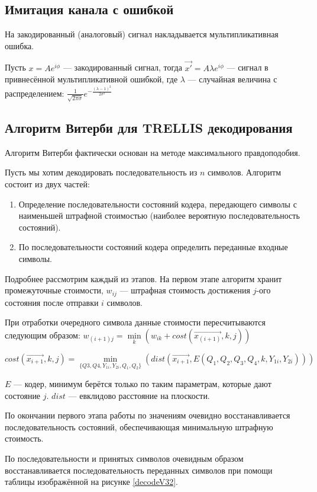 \documentclass[a4paper,12pt]{article}
\begin{document}
\subsection{Имитация канала с ошибкой}
На закодированный (аналоговый) сигнал накладывается мультипликативная ошибка. 

Пусть $x = A e^{i\phi}$ --- закодированный сигнал, тогда $\vec{x'} = A\lambda e^{i\phi}$ --- сигнал в привнесённой
мультипликативной ошибкой, где $\lambda$ --- случайная величина с распределением: 
$\frac{1}{\sqrt{2\pi\sigma}}e^{-\frac{(\lambda - 1)^2}{2\sigma^2}}$

\subsection{Алгоритм Витерби для TRELLIS декодирования}
Алгоритм Витерби фактически основан на методе максимального правдоподобия.

Пусть мы хотим декодировать последовательность из $n$ символов. Алгоритм состоит из двух частей:
\begin{enumerate}
	\item Определение последовательности состояний кодера, передающего символы с наименьшей штрафной стоимостью
		(наиболее вероятную последовательность состояний).
	\item По последовательности состояний кодера определить переданные входные символы.
\end{enumerate}

Подробнее рассмотрим каждый из этапов. На первом этапе алгоритм хранит промежуточные стоимости, $w_{ij}$ --- штрафная
стоимость достижения $j$-ого состояния после отправки $i$ символов.

При отработки очередного символа данные стоимости пересчитываются следующим образом:
$w_{(i + 1)j} = \min\limits_{k}(w_{ik} + cost(\vec{x_(i + 1)}, k, j))$

$cost(\vec{x_{i + 1}}, k, j) = \min\limits_{\{Q3, Q4, Y_{1i}, Y_{2i}, Q_1, Q_2\}}
(dist(\vec{x_{i + 1}}, E(Q_1, Q_2, Q_3, Q_4, k, Y_{1i}, Y_{2i})))$

$E$ --- кодер, минимум берётся только по таким параметрам, которые дают состояние $j$. $dist$ --- евклидово расстояние
на плоскости.

По окончании первого этапа работы по значениям очевидно восстанавливается последовательность состояний, обеспечивающая
минимальную штрафную стоимость.

По последовательности и принятых символов очевидным образом восстанавливается последовательность переданных символов
при помощи таблицы изображённой на рисунке \ref{decodeV32}.
\end{document}
